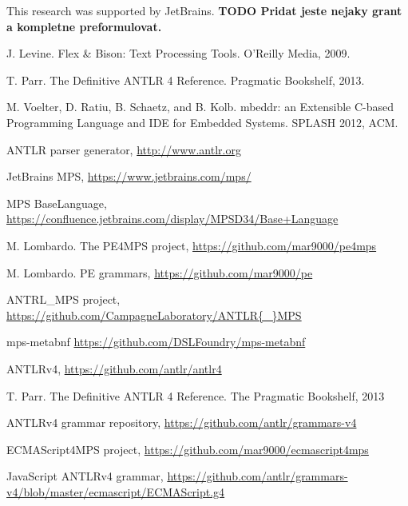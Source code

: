 \documentclass[10pt]{sigplanconf}
\newcommand{\todo}[1]{{\bfseries TODO #1}}
\begin{document}
\acks
This research was supported by JetBrains. \todo{Pridat jeste nejaky grant a kompletne preformulovat.}



\begin{thebibliography}{}

 J. Levine. Flex \& Bison: Text Processing Tools. O'Reilly Media, 2009.

 T. Parr. The Definitive ANTLR 4 Reference. Pragmatic Bookshelf, 2013.

 M. Voelter, D. Ratiu, B. Schaetz, and B. Kolb. mbeddr: an Extensible C-based Programming Language and IDE for Embedded Systems. SPLASH 2012, ACM.

 ANTLR parser generator, \url{http://www.antlr.org}

 JetBrains MPS, \url{https://www.jetbrains.com/mps/}

 MPS BaseLanguage, \url{https://confluence.jetbrains.com/display/MPSD34/Base+Language}

 M. Lombardo. The PE4MPS project, \url{https://github.com/mar9000/pe4mps}

 M. Lombardo. PE grammars, \url{https://github.com/mar9000/pe}



 ANTRL{\_}MPS project, \url{https://github.com/CampagneLaboratory/ANTLR{\_}MPS}

 mps-metabnf \url{https://github.com/DSLFoundry/mps-metabnf}

 ANTLRv4, \url{https://github.com/antlr/antlr4}

 T. Parr. The Definitive ANTLR 4 Reference. The Pragmatic Bookshelf, 2013

 ANTLRv4 grammar repository, \url{https://github.com/antlr/grammars-v4}

 ECMAScript4MPS project, \url{https://github.com/mar9000/ecmascript4mps}

 JavaScript ANTLRv4 grammar, \url{https://github.com/antlr/grammars-v4/blob/master/ecmascript/ECMAScript.g4}

\end{thebibliography}
\end{document}
